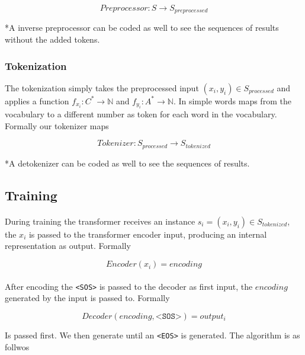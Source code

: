 \documentclass[]{article}
\begin{document}
\begin{equation}
    Preprocessor: S \rightarrow S_{preprocessed}
\end{equation}

*A inverse preprocessor can be coded as well to see the sequences of results without the added tokens.

\subsubsection*{Tokenization}
The tokenization simply takes the preprocessed input $(x_i, y_i) \in S_{processed}$ and applies a function $f_{x_i}: C^* \rightarrow \mathbb{N}$ and $f_{y_i}: A^* \rightarrow \mathbb{N}$. In simple words maps from the vocabulary to a different number as token for each word in the vocabulary. Formally our tokenizer maps

\begin{equation}
    Tokenizer: S_{processed} \rightarrow S_{tokenized}
\end{equation}

*A detokenizer can be coded as well to see the sequences of results.

\subsection*{Training}
\paragraph*{}
During training the transformer receives an instance $s_i = (x_i, y_i) \in S_{tokenized}$, the $x_i$ is passed to the transformer encoder input, producing an internal representation as output. Formally


\begin{equation}
    Encoder(x_i) = encoding
\end{equation}

\paragraph*{}
After encoding the \texttt{<SOS>} is passed to the decoder as first input, the $encoding$ generated by the input is passed to. Formally

\begin{equation}
    Decoder(encoding, \texttt{<SOS>}) = output_i
\end{equation}

Is passed first. We then generate until an \texttt{<EOS>} is generated. The algorithm is as follwos
\end{document}
